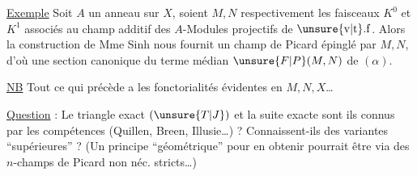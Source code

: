 
\uline{Exemple} Soit $A$ un anneau sur $X$, soient $M,N$ respectivement les faisceaux $K^{0}$ et $K^{1}$ associés au champ additif des $A$-Modules projectifs de $\unsure{\mathrm{v}|\mathrm{t}}.\mathrm{f}$.  Alors la construction de Mme Sinh nous fournit un champ de Picard épinglé par $M,N$, d'où une section  canonique du terme médian $\unsure{F|P}(M,N)$ de $(\alpha)$.

\uline{NB} Tout ce qui précède a les fonctorialités évidentes en $M,N,X$\ldots

\uline{Question} : Le triangle exact $(\unsure{T|J})$ et \unsure{-} la suite exacte \unsure{$\alpha$)|($\alpha$)|$\alpha$} sont ils connus par les compétences (Quillen, Breen, Illusie\ldots) ? Connaissent-ils des variantes ``supérieures'' ? (Un principe ``géométrique'' pour en obtenir pourrait être via des $n$-champs de Picard non néc. stricts\ldots)
